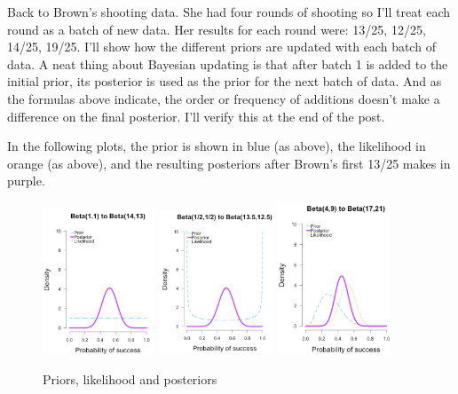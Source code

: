 Back to Brown's shooting data. She had four rounds of shooting so I'll treat each round as a batch of new data. Her results for each round were: 13/25, 12/25, 14/25, 19/25. I'll show how the different priors are updated with each batch of data. A neat thing about Bayesian updating is that after batch 1 is added to the initial prior, its posterior is used as the prior for the next batch of data. And as the formulas above indicate, the order or frequency of additions doesn't make a difference on the final posterior. I'll verify this at the end of the post.

In the following plots, the prior is shown in blue (as above), the likelihood in orange (as above), and the resulting posteriors after Brown's first 13/25 makes in purple.


\begin{figure}[h]
    \centering
\includegraphics[width=0.3\textwidth]{pic/p05c03-snip07-1.png}
\includegraphics[width=0.3\textwidth]{pic/p05c03-snip07-2.png}
\includegraphics[width=0.3\textwidth]{pic/p05c03-snip07-3.png}
    \caption{Priors, likelihood and posteriors}
    \label{fig:p05c03-snip07}
\end{figure}

